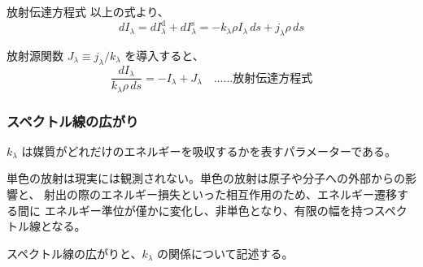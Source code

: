 \documentclass[unicode,colorlinks]{beamer}
\begin{document}
\begin{frame}{放射伝達方程式}
	以上の式より、
	\[
		dI_\lambda=dI_\lambda^\mathrm{d}+dI_\lambda^\mathrm{s}
		=-k_\lambda\rho I_\lambda\,ds+j_\lambda\rho\,ds
	\]

	放射源関数 $J_\lambda\equiv j_\lambda/k_\lambda$ を導入すると、
	\[\frac{dI_\lambda}{k_\lambda\rho\,ds}=-I_\lambda+J_\lambda\quad\text{……放射伝達方程式}\]
\end{frame}

\begin{frame}
	\frametitle{スペクトル線の広がり}
	$k_\lambda$ は媒質がどれだけのエネルギーを吸収するかを表すパラメーターである。

	単色の放射は現実には観測されない。単色の放射は原子や分子への外部からの影響と、
	射出の際のエネルギー損失といった相互作用のため、エネルギー遷移する間に
	エネルギー準位が僅かに変化し、非単色となり、有限の幅を持つスペクトル線となる。

	スペクトル線の広がりと、$k_\lambda$ の関係について記述する。
\end{frame}
\end{document}
